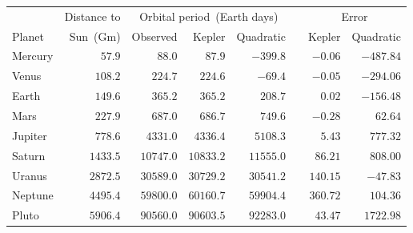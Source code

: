 \begin{tabular}{lrrrrrrr} \toprule
        & Distance to & \multicolumn{3}{c}{Orbital period~(Earth days)} && \multicolumn{2}{c}{Error} \\
  \cmidrule{3-5} \cmidrule{7-8}
Planet  & Sun~(Gm)    & Observed     & Kepler    & Quadratic && Kepler   & Quadratic \\\midrule
Mercury & $57.9$      & $88.0$       & $87.9$    & $-399.8$  && $-0.06$  & $-487.84$ \\[4pt]
Venus   & $108.2$     & $224.7$      & $224.6$   & $-69.4$   && $-0.05$  & $-294.06$ \\[4pt]
Earth   & $149.6$     & $365.2$      & $365.2$   & $208.7$   && $0.02$   & $-156.48$ \\[4pt]
Mars    & $227.9$     & $687.0$      & $686.7$   & $749.6$   && $-0.28$  & $62.64$   \\[4pt]
Jupiter & $778.6$     & $4331.0$     & $4336.4$  & $5108.3$  && $5.43$   & $777.32$  \\[4pt]
Saturn  & $1433.5$    & $10747.0$    & $10833.2$ & $11555.0$ && $86.21$  & $808.00$  \\[4pt]
Uranus  & $2872.5$    & $30589.0$    & $30729.2$ & $30541.2$ && $140.15$ & $-47.83$  \\[4pt]
Neptune & $4495.4$    & $59800.0$    & $60160.7$ & $59904.4$ && $360.72$ & $104.36$  \\[4pt]
Pluto   & $5906.4$    & $90560.0$    & $90603.5$ & $92283.0$ && $43.47$  & $1722.98$ \\\bottomrule
\end{tabular}
